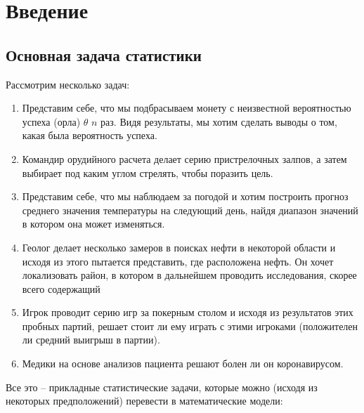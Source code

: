 \documentclass[10 pt,russian]{article}
\begin{document}
\newtheorem{Th}{Теорема}
\newtheorem{Lemm}{Лемма}
\theoremstyle{definition}
\newtheorem{Def}{Определение}
\newtheorem{Rem}{Замечание}
\newtheorem{Exam}{Пример}
\newtheorem{Que}{Вопрос}
\thispagestyle{empty}
\sloppy
\large
\section{Введение}
\subsection{Основная задача статистики}
Рассмотрим несколько задач:
\begin{enumerate}
\item Представим себе, что мы подбрасываем монету с неизвестной вероятностью успеха (орла) $\theta$ $n$ раз. Видя результаты, мы хотим сделать выводы о том, какая была вероятность успеха.
\item Командир орудийного расчета делает серию пристрелочных залпов, а затем выбирает под каким углом стрелять, чтобы поразить цель.
\item Представим себе, что мы наблюдаем за погодой и хотим построить прогноз среднего значения температуры на следующий день, найдя диапазон значений в котором она может изменяться. 
\item Геолог делает несколько замеров в поисках нефти в некоторой области и исходя из этого пытается представить, где расположена нефть. Он хочет локализовать район, в котором в дальнейшем проводить исследования, скорее всего содержащий 
\item Игрок проводит серию игр за покерным столом и исходя из результатов этих пробных партий, решает стоит ли ему играть с этими игроками (положителен ли средний выигрыш в партии).
\item Медики на основе анализов пациента решают болен ли он коронавирусом.
\end{enumerate}
Все это -- прикладные статистические задачи, которые можно (исходя из некоторых предположений) перевести в математические модели:
\end{document}
